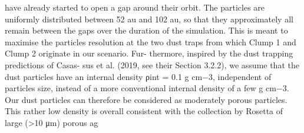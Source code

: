 \documentclass[11pt,twoside, openright]{report}
\begin{document}
      have already started to open a gap around their orbit. The particles are uniformly distributed between 52 au and 102 au, so that they approximately all remain between the gaps over the duration of the simulation. This is meant to maximise the particles resolution at the two dust traps from which Clump 1 and Clump 2 originate in our scenario. Fur- thermore, inspired by the dust trapping predictions of Casas- sus et al. (2019, see their Section 3.2.2), we assume that the dust particles have an internal density ρint = 0.1 g cm−3, independent of particles size, instead of a more conventional internal density of a few g cm−3. Our dust particles can therefore be considered as moderately porous particles. This rather low density is overall consistent with the collection by Rosetta of large (>10 μm) porous ag 

        


 
\end{document}
